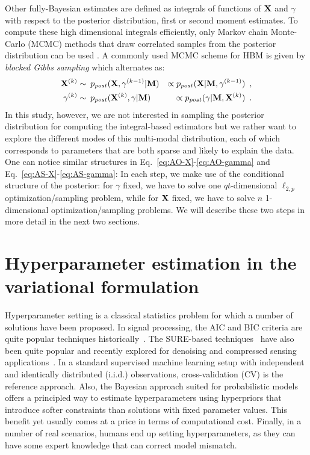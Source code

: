 Other fully-Bayesian estimates are defined as integrals of functions of $\mathbf{X}$ and $\gamma$ with respect to the posterior distribution, \eg first or second moment estimates. To compute these high dimensional integrals efficiently, only Markov chain Monte-Carlo (MCMC) methods that draw correlated samples from the posterior distribution can be used\cite{RoCa05,KaSo05} . A commonly used MCMC scheme for HBM is given by \emph{blocked Gibbs sampling} which alternates as:
\begin{eqnarray}
\mathbf{X}^{(k)} &\sim \: p_{post}(\mathbf{X},\gamma^{(k-1)}|\mathbf{M}) &\propto p_{post}(\mathbf{X}|\mathbf{M},\gamma^{(k-1)}) \enspace, \label{eq:AS-X}\\
\gamma^{(k)} &\sim \: p_{post}(\mathbf{X}^{(k)},\gamma|\mathbf{M}) &\propto p_{post}(\gamma|\mathbf{M},\mathbf{X}^{(k)})\enspace. \label{eq:AS-gamma}
\end{eqnarray}
In this study, however, we are not interested in sampling the posterior distribution for computing the integral-based estimators but we rather want to explore the different modes of this multi-modal distribution, each of which corresponds to parameters that are both sparse and likely to explain the data.\\
One can notice similar structures in Eq.~\ref{eq:AO-X}-\ref{eq:AO-gamma} and Eq.~\ref{eq:AS-X}-\ref{eq:AS-gamma}: In each step, we make use of the conditional structure of the posterior: for $\gamma$ fixed, we have to solve one $qt$-dimensional $\ell_{2,p}$ optimization/sampling problem, while for $\mathbf{X}$ fixed, we have to solve $n$ 1-dimensional optimization/sampling problems. We will describe these two steps in more detail in the next two sections.

\section{Hyperparameter estimation in the variational formulation}

Hyperparameter setting is a classical statistics problem for which a number of  solutions have been proposed. In signal processing, the AIC and BIC criteria are quite popular techniques historically~\cite{schwarz1978estimating}. The SURE-based techniques~\cite{stein1981estimation} have also been quite popular and recently explored for denoising and compressed sensing applications~\cite{luisier2007new, guo2015near}. In a standard supervised machine learning setup with independent and identically distributed (i.i.d.) observations, cross-validation (CV) is the reference approach. 
Also, the Bayesian approach suited for probabilistic models offers a principled way to estimate hyperparameters using hyperpriors that introduce softer constraints than solutions with fixed parameter values. This benefit yet usually comes at a price in terms of computational cost. Finally, in a number of real scenarios, humans end up setting hyperparameters, as they can have some expert knowledge that can correct model mismatch.

